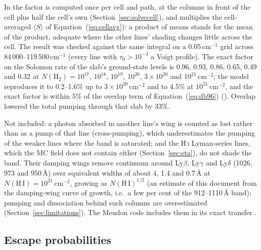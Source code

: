In  the factor is computed once per cell and path, at the columns
in front of the cell plus half the cell's own (Section~\ref{sec:solvecell}), and
multiplies the cell-averaged $\langle S\rangle$ of Equation~(\ref{eq:cellavg}): a product of
means stands for the mean of the product, adequate where the other lines'
shading changes little across the cell. The result was checked against the
same integral on a 0.05\,cm$^{-1}$ grid across 84\,000--119\,500\,cm$^{-1}$ (every line
with $\tau_0>10^{-3}$ a Voigt profile). The exact factor on the Solomon rate of the
 slab's ground-state levels is 0.96, 0.93, 0.86, 0.65, 0.49 and 0.32 at
$N(\mathrm{H_2})=10^{17}$, $10^{18}$, $10^{19}$, $10^{20}$, $3\times10^{20}$ and
$10^{21}$\,cm$^{-2}$; the model reproduces it to 0.2--1.6\% up to
$3\times10^{20}$\,cm$^{-2}$ and to 4.5\% at $10^{21}$\,cm$^{-2}$, and the exact factor is
within 5\% of the overlap term of Equation~(\ref{eq:db96}) ().
Overlap lowered the total pumping through that slab by 33\%.

Not included: a photon absorbed in another line's wing is counted as lost
rather than as a pump of that line (cross-pumping), which underestimates the
pumping of the weaker lines where the band is saturated; and the
H\,\textsc{i} Lyman-series lines, which the MC field does not contain either
(Section~\ref{sec:eta}), do not shade the band. Their damping wings remove
continuum around Ly$\beta$, Ly$\gamma$ and Ly$\delta$ (1026, 973 and 950\,\AA) over
equivalent widths of about 4, 1.4 and 0.7\,\AA{} at
$N(\mathrm{H\,I})=10^{21}$\,cm$^{-2}$, growing as $N(\mathrm{H\,I})^{1/2}$ (an
estimate of this document from the damping-wing curve of growth, i.e.\ a few
per cent of the 912--1110\,\AA{} band); pumping and dissociation behind such
columns are overestimated (Section~\ref{sec:limitations}). The Meudon code
includes them in its exact transfer \citep{LePetit2006}.

\subsection{Escape probabilities}
\label{sec:escape}

